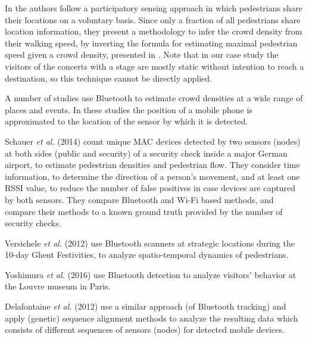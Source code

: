 \documentclass[10pt,a4paper]{article}
\begin{document}
In  \cite{wirz:2} the authors follow a participatory sensing approach in which pedestrians share their locations on
a voluntary basis. Since  only a fraction of
all pedestrians share location information, they present a methodology to infer the crowd density from their walking speed, by inverting the formula for estimating maximal pedestrian speed given a crowd density, presented in \cite{Johannsson}. Note that in our case study the visitors of the concerts with a stage are mostly static without intention to reach a destination, so this technique cannot be directly applied. 



A number of studies use Bluetooth to estimate crowd densities at a wide range of places and events.
In these studies the position of a mobile phone is approximated to the location of the sensor by which it is detected.

Schauer \textit{et al.} (2014) \cite{schauer:1} count unique MAC devices detected by two sensors (nodes) at both sides (public and security) of a security check inside a major German airport, to estimate pedestrian densities and pedestrian flow. They consider time information, to determine the direction of a person's movement, and at least one RSSI value, to reduce the number of false positives in case devices are captured by both sensors. They compare Bluetooth and Wi-Fi based methods, and compare their methods to a known ground truth provided by the number of security checks.

Versichele \textit{et al.} (2012) \cite{versichele:1} use Bluetooth scanners at strategic locations during the 10-day Ghent Festivities, to analyze spatio-temporal dynamics of pedestrians. 

Yoshimura \textit{et al.} (2016) \cite{yoshimura:1} use Bluetooth detection to analyze visitors' behavior at the Louvre museum in Paris.

Delafontaine \textit{et al.} (2012) \cite{delafontaine:1} use a similar approach (of Bluetooth tracking) and apply (genetic) sequence alignment methods to analyze the resulting data which consists of different sequences of sensors (nodes) for detected mobile devices.
\end{document}
